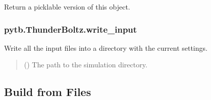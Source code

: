 \documentclass[letterpaper,10pt,english,openany,oneside]{sphinxmanual}
\begin{document}
\begin{fulllineitems}
\begin{fulllineitems}
\label{\detokenize{api/pytb.ThunderBoltz.to_pickleable:pytb.ThunderBoltz.to_pickleable}}
\pysigstartsignatures
{}
\pysigstopsignatures
\sphinxAtStartPar
Return a picklable version of this object.

\end{fulllineitems}


\sphinxstepscope


\subsubsection{pytb.ThunderBoltz.write\_input}
\label{\detokenize{api/pytb.ThunderBoltz.write_input:pytb-thunderboltz-write-input}}\label{\detokenize{api/pytb.ThunderBoltz.write_input::doc}}

\begin{fulllineitems}
\label{\detokenize{api/pytb.ThunderBoltz.write_input:pytb.ThunderBoltz.write_input}}
\pysigstartsignatures
{}
\pysigstopsignatures
\sphinxAtStartPar
Write all the input files into a directory with
the current settings.
\begin{quote}\begin{description}
\sphinxAtStartPar
{} () \textendash{} The path to the simulation directory.

\end{description}\end{quote}

\end{fulllineitems}


\end{fulllineitems}



\subsection{Build from Files}
\label{\detokenize{ref:build-from-files}}
\end{document}
